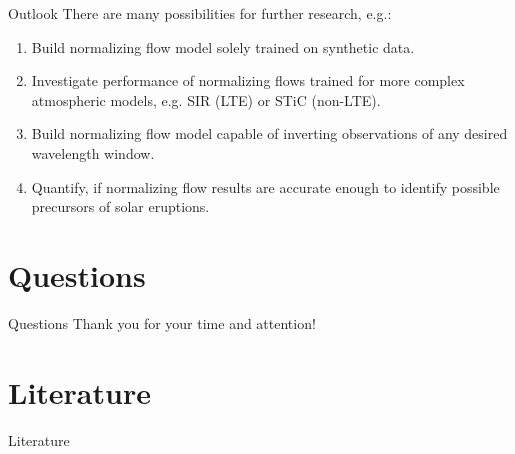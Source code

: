 \documentclass{beamer}
\begin{document}
\begin{frame}[allowframebreaks]{Outlook}
	There are many possibilities for further research, e.g.:
	\begin{enumerate}
\item Build normalizing flow model solely trained on synthetic data. %
\item Investigate performance of normalizing flows trained for more complex atmospheric models, e.g. SIR (LTE) or STiC (non-LTE). %
\item Build normalizing flow model capable of inverting observations of any desired wavelength window. %
\item Quantify, if normalizing flow results are accurate enough to identify possible precursors of solar eruptions.
	\end{enumerate}%
\end{frame}

\section*{Questions}
\begin{frame}[allowframebreaks]{Questions}
Thank you for your time and attention!
\end{frame}

\appendix

\section*{Literature}
\begin{frame}[allowframebreaks]{Literature}
\tiny


\end{frame}
\end{document}
